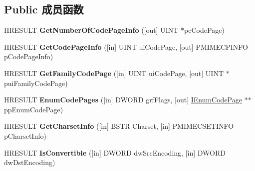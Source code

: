 \subsection*{Public 成员函数}
\begin{DoxyCompactItemize}
\item 
\mbox{\label{interface_multi_language_1_1_i_multi_language_ae235e123bae340316cf164001ae2d5cb}} 
H\+R\+E\+S\+U\+LT {\bfseries Get\+Number\+Of\+Code\+Page\+Info} (\mbox{[}out\mbox{]} U\+I\+NT $\ast$pc\+Code\+Page)
\item 
\mbox{\label{interface_multi_language_1_1_i_multi_language_aa255e5c414328d1c82955e8dfc90e17b}} 
H\+R\+E\+S\+U\+LT {\bfseries Get\+Code\+Page\+Info} (\mbox{[}in\mbox{]} U\+I\+NT ui\+Code\+Page, \mbox{[}out\mbox{]} P\+M\+I\+M\+E\+C\+P\+I\+N\+FO p\+Code\+Page\+Info)
\item 
\mbox{\label{interface_multi_language_1_1_i_multi_language_a0628f2ec2d5f90d5da905e1d962fc0f2}} 
H\+R\+E\+S\+U\+LT {\bfseries Get\+Family\+Code\+Page} (\mbox{[}in\mbox{]} U\+I\+NT ui\+Code\+Page, \mbox{[}out\mbox{]} U\+I\+NT $\ast$pui\+Family\+Code\+Page)
\item 
\mbox{\label{interface_multi_language_1_1_i_multi_language_a14d1ca9c96c7906ebf6690bf9550386f}} 
H\+R\+E\+S\+U\+LT {\bfseries Enum\+Code\+Pages} (\mbox{[}in\mbox{]} D\+W\+O\+RD grf\+Flags, \mbox{[}out\mbox{]} \hyperlink{interface_multi_language_1_1_i_enum_code_page}{I\+Enum\+Code\+Page} $\ast$$\ast$pp\+Enum\+Code\+Page)
\item 
\mbox{\label{interface_multi_language_1_1_i_multi_language_aae9a2d4727d07c727de3d51671abe1e0}} 
H\+R\+E\+S\+U\+LT {\bfseries Get\+Charset\+Info} (\mbox{[}in\mbox{]} B\+S\+TR Charset, \mbox{[}in\mbox{]} P\+M\+I\+M\+E\+C\+S\+E\+T\+I\+N\+FO p\+Charset\+Info)
\item 
\mbox{\label{interface_multi_language_1_1_i_multi_language_aa1dcbef8d2d703553f2e9ca50f45c549}} 
H\+R\+E\+S\+U\+LT {\bfseries Is\+Convertible} (\mbox{[}in\mbox{]} D\+W\+O\+RD dw\+Src\+Encoding, \mbox{[}in\mbox{]} D\+W\+O\+RD dw\+Dst\+Encoding)
$$
\end{DoxyCompactItemize}

